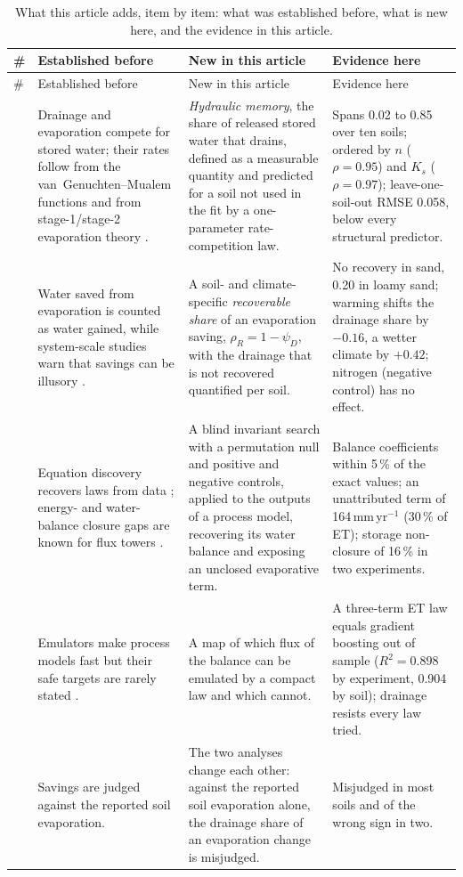 {\small\setlength{\tabcolsep}{4pt}
\begin{longtable}{@{}>{\raggedright\arraybackslash}p{}>{\raggedright\arraybackslash}p{}>{\raggedright\arraybackslash}p{}>{\raggedright\arraybackslash}p{}@{}}
\caption{What this article adds, item by item: what was established before, what is new here, and the evidence in this article.}\label{tab:novelty}\\
\toprule
\# & Established before & New in this article & Evidence here\\\midrule\endfirsthead
\toprule \# & Established before & New in this article & Evidence here\\\midrule\endhead
1 & Drainage and evaporation compete for stored water; their rates follow from the van~Genuchten--Mualem functions and from stage-1/stage-2 evaporation theory \citep{vanGenuchten1980,Mualem1976,Lehmann2008,Or2013}. & \emph{Hydraulic memory}, the share of released stored water that drains, defined as a measurable quantity and predicted for a soil not used in the fit by a one-parameter rate-competition law. & Spans 0.02 to 0.85 over ten soils; ordered by $n$ ($\rho=0.95$) and $K_s$ ($\rho=0.97$); leave-one-soil-out RMSE 0.058, below every structural predictor.\\
2 & Water saved from evaporation is counted as water gained, while system-scale studies warn that savings can be illusory \citep{Perry2017,Grafton2018}. & A soil- and climate-specific \emph{recoverable share} of an evaporation saving, $\rho_R=1-\psi_D$, with the drainage that is not recovered quantified per soil. & No recovery in sand, 0.20 in loamy sand; warming shifts the drainage share by $-0.16$, a wetter climate by $+0.42$; nitrogen (negative control) has no effect.\\
3 & Equation discovery recovers laws from data \citep{Schmidt2009,Brunton2016,Udrescu2020}; energy- and water-balance closure gaps are known for flux towers \citep{Wilson2002,Foken2008}. & A blind invariant search with a permutation null and positive and negative controls, applied to the outputs of a process model, recovering its water balance and exposing an unclosed evaporative term. & Balance coefficients within 5\,\% of the exact values; an unattributed term of 164\,mm\,yr$^{-1}$ (30\,\% of ET); storage non-closure of 16\,\% in two experiments.\\
4 & Emulators make process models fast but their safe targets are rarely stated \citep{Razavi2012,Asher2015}. & A map of which flux of the balance can be emulated by a compact law and which cannot. & A three-term ET law equals gradient boosting out of sample ($R^2=0.898$ by experiment, 0.904 by soil); drainage resists every law tried.\\
5 & Savings are judged against the reported soil evaporation. & The two analyses change each other: against the reported soil evaporation alone, the drainage share of an evaporation change is misjudged. & Misjudged in most soils and of the wrong sign in two.\\
\bottomrule
\end{longtable}}
